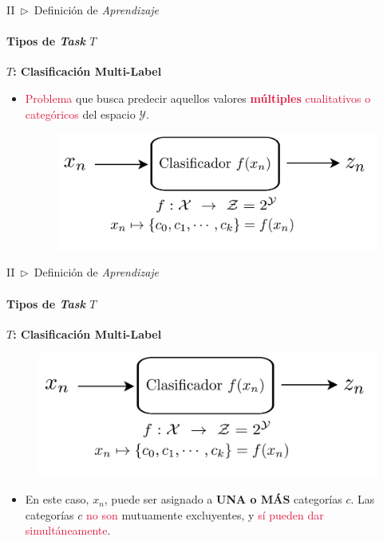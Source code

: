 \documentclass[xcolor=dvipsnames]{beamer}
\begin{document}
    \begin{frame}{II~$\rhd$~Definición de \textit{Aprendizaje}}
    \framesubtitle{Tipos de \textit{Task} \( T \)}
        \textbf{\Large{\( T \): Clasificación Multi-Label}}
        \vspace{2mm}
        \begin{itemize}
            \item \textcolor{crimson}{Problema} que busca predecir aquellos valores \textcolor{crimson}{\textbf{múltiples} cualitativos o categóricos} del espacio $\mathcal{Y}$.
            \vspace{1mm}
            \begin{figure}
                \centering
                \includegraphics[width=0.9\linewidth]{imgs/def01/task04.png}
            \end{figure}
        \end{itemize}
    \end{frame}

    \begin{frame}{II~$\rhd$~Definición de \textit{Aprendizaje}}
    \framesubtitle{Tipos de \textit{Task} \(T\)}
        \textbf{\Large{\( T \): Clasificación Multi-Label}}
        \begin{figure}
            \centering
            \includegraphics[width=0.55\linewidth]{imgs/def01/task04.png}
        \end{figure}
        \begin{itemize}
            \item En este caso, $x_{n}$, puede ser asignado a \textbf{UNA o MÁS} categorías $c$. Las categorías $c$ \textcolor{crimson}{no son} mutuamente excluyentes, y \textcolor{crimson}{sí pueden dar simultáneamente}.
        \end{itemize}
    \end{frame}
\end{document}
